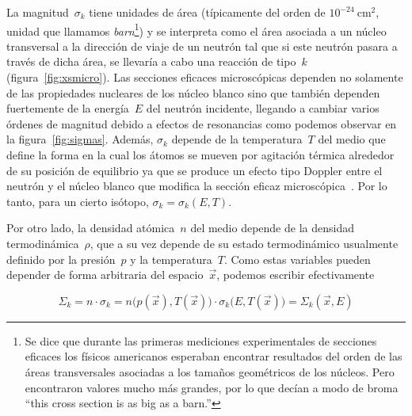 La magnitud~$\sigma_k$ tiene unidades de área (típicamente del orden de $10^{-24}~\text{cm}^2$, unidad que llamamos \emph{barn}\footnote{Se dice que durante las primeras mediciones experimentales de secciones eficaces los físicos americanos esperaban encontrar resultados del orden de las áreas transversales asociadas a los tamaños geométricos de los núcleos. Pero encontraron valores mucho más grandes, por lo que decían a modo de broma {“\foreignlanguage{english}this cross section is as big as a barn.”}}) y se interpreta como el área asociada a un núcleo transversal a la dirección de viaje de un neutrón tal que si este neutrón pasara a través de dicha área, se llevaría a cabo una reacción de tipo~$k$ (figura~\ref{fig:xsmicro}). Las secciones eficaces microscópicas dependen no solamente de las propiedades nucleares de los núcleo blanco sino que también dependen fuertemente de la energía~$E$ del neutrón incidente, llegando a cambiar varios órdenes de magnitud debido a efectos de resonancias como podemos observar en la figura~\ref{fig:sigmas}. Además, $\sigma_k$ depende de la temperatura~$T$ del medio que define la forma en la cual los átomos se mueven por agitación térmica alrededor de su posición de equilibrio ya que se produce un efecto tipo Doppler entre el neutrón y el núcleo blanco que modifica la sección eficaz microscópica~\cite{aatn-doppler-2013,aatn-doppler-2014}. Por lo tanto, para un cierto isótopo, $\sigma_k = \sigma_k(E,T)$.

Por otro lado, la densidad atómica~$n$ del medio depende de la densidad termodinámica~$\rho$, que a su vez depende de su estado termodinámico usualmente definido por la presión~$p$ y la temperatura~$T$. Como estas variables pueden depender de forma arbitraria del espacio~$\vec{x}$, podemos escribir efectivamente

\begin{equation*}
 \Sigma_k = n \cdot \sigma_k = n \Big( p(\vec{x}), T(\vec{x}) \Big) \cdot \sigma_k \Big(E, T(\vec{x}) \Big) = \Sigma_k (\vec{x}, E)
\end{equation*}


